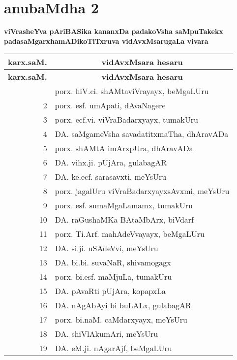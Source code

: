 \chapter*{anubaMdha 2}

\lhead[]{}
\rhead[]{}

\begin{center}
{\large\bf viVrasheYva pAriBASika kananxDa padakoVsha saMpuTakekx padasaMgarxha\break mADikoTiTxruva vidAvxMsarugaLa vivara}
\end{center}

{\renewcommand{\arraystretch}{1.4}
\begin{longtable}{|r|p{10cm}|}
\hline
{\bf karx.saM.} & \multicolumn{1}{c|}{\bf vidAvxMsara hesaru}\\
\hline
\endfirsthead
\hline
{\bf karx.saM.} & \multicolumn{1}{c|}{\bf vidAvxMsara hesaru}\\
\hline
\endhead
\hline
\endfoot
\endlastfoot
1 & porx. hiV.ci. shAMtaviVrayayx, beMgaLUru\\
\hline
2 & porx. esf. umApati, dAvaNagere\\
\hline
3 & porx. ecf.vi. viVraBadarxyayx, tumakUru\\
\hline
4 & DA. saMgameVsha savadatitxmaTha, dhAravADa\\
\hline
5 & porx. shAMtA imArxpUra, dhAravADa\\
\hline
6 & DA. vihx.ji. pUjAra, gulabagAR\\
\hline
7 & DA. ke.ecf. sarasavxti, meYsUru\\
\hline
8 & porx. jagalUru viVraBadarxyayxsAvxmi, meYsUru\\
\hline
9 & porx. esf. sumaMgaLamamx, tumakUru\\
\hline
10 & DA. raGushaMKa BAtaMbArx, biVdarf\\
\hline
11 & porx. Ti.Arf. mahAdeVvayayx, beMgaLUru\\
\hline
12 & DA. si.ji. uSAdeVvi, meYsUru\\
\hline
13 & DA. bi.bi. suvaNaR, shivamogagx\\
\hline
14 & porx. bi.esf. maMjuLa, tumakUru\\
\hline
15 & DA. pAvaRti pUjAra, kopapxLa\\
\hline
16 & DA. nAgAbAyi bi buLALx, gulabagAR\\
\hline
17 & porx. bi.naM. caMdarxyayx, meYsUru\\
\hline
18 & DA. shiVlAkumAri, meYsUru\\
\hline
19 & DA. eM.ji. nAgarAjf, beMgaLUru\\

\end{longtable}}
